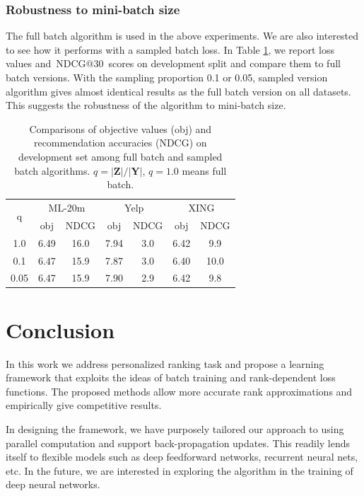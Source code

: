 \documentclass[letterpaper]{article}
\makeatletter
\newcommand{\ndcg}{{\textsc{NDCG@30}}}
\newcommand{\xing}{\textsf{XING}}
\newcommand{\yelp}{\textsf{Yelp}}
\newcommand{\movietwenty}{\textsf{ML-20m}}
\makeatother
\begin{document}
\subsubsection{Robustness to mini-batch size}

The full batch algorithm is used in the above experiments. We are also interested to see how it performs with a sampled batch loss. In Table \ref{t:sampled}, we report loss values and~\ndcg~scores on development split and compare them to full batch versions. With the sampling proportion 0.1 or 0.05, sampled version algorithm gives almost identical results as the full batch version on all datasets. This suggests the robustness of the algorithm to mini-batch size.

\begin{table}
\centering
\begin{adjustbox}{width=0.07\columnwidth}
\begin{tabular} { |c|| c | c | c | c| c|c|} \hline
 \multirow{ 2}{*}{q}	         & \multicolumn{2}{|c|}{\movietwenty}  & \multicolumn{2}{|c|}{\yelp} & \multicolumn{2}{|c|}{\xing}  \\ \cline{2-7}
                  &  obj & \small{NDCG} & obj & \small{NDCG} & obj & \small{NDCG} \\ \hline
1.0    & 6.49 & 16.0  & 7.94 & 3.0   &  6.42  & 9.9\\ \hline
0.1  & 6.47 & 15.9    & 7.87  & 3.0  & 6.40  & 10.0 \\ \hline
0.05    & 6.47 & 15.9    & 7.90   &2.9  & 6.42  & 9.8\\ \hline
\end{tabular}
\end{adjustbox}
\caption{Comparisons of objective values (obj) and recommendation accuracies (NDCG) on development set among full batch and sampled batch algorithms. $q=|\textbf{Z}|/|\textbf{Y}|$, $q=1.0$ means full batch.} \label{t:sampled}
\end{table}

\section{Conclusion}

In this work we address personalized ranking task and propose a learning framework that exploits the ideas of batch training and rank-dependent loss functions. The proposed methods allow more accurate rank approximations and empirically give competitive results.

In designing the framework, we have purposely tailored our approach to using parallel computation and support back-propagation updates. This readily lends itself to flexible models such as deep feedforward networks, recurrent neural nets, etc. In the future, we are interested in exploring the algorithm in the training of deep neural networks.
\end{document}
